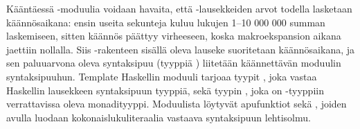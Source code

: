 Kääntäessä -moduulia voidaan havaita,
että -lausekkeiden arvot todella lasketaan käännösaikana:
ensin useita sekunteja kuluu lukujen 1--10 000 000 summan laskemiseen,
sitten käännös päättyy virheeseen,
koska makroekspansion aikana jaettiin nollalla.
Siis \Haskell{\$()}-rakenteen sisällä oleva lauseke suoritetaan käännösaikana,
ja sen paluuarvona oleva syntaksipuu (tyyppiä ) liitetään käännettävän moduulin
syntaksipuuhun.
Template Haskellin moduuli  tarjoaa tyypit ,
joka vastaa Haskellin lausekkeen syntaksipuun tyyppiä,
sekä tyypin ,
joka on -tyyppiin verrattavissa oleva monadityyppi.
Moduulista  löytyvät apufunktiot 
sekä ,
joiden avulla luodaan kokonaislukuliteraalia vastaava syntaksipuun lehtisolmu.

